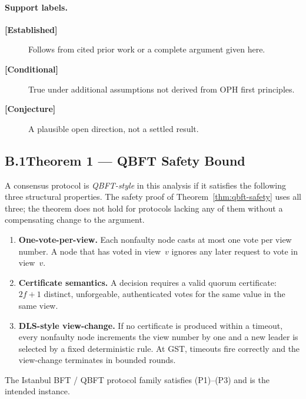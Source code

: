 \paragraph{Support labels.}
\begin{description}
  \item[\textbf{[Established]}] Follows from cited prior work or a complete
        argument given here.
  \item[\textbf{[Conditional]}] True under additional assumptions not
        derived from \textrm{OPH} first principles.
  \item[\textbf{[Conjecture]}] A plausible open direction, not a settled result.
\end{description}

\subsection*{B.1\quad Theorem 1 --- QBFT Safety Bound}

\begin{definition}
\label{def:qbft-style}
A consensus protocol is \emph{QBFT-style} in this analysis if it satisfies
the following three structural properties.
The safety proof of Theorem~\ref{thm:qbft-safety} uses all three;
the theorem does not hold for protocols lacking any of them without a
compensating change to the argument.
\begin{enumerate}[(P1)]
  \item \textbf{One-vote-per-view.}
        Each nonfaulty node casts at most one vote per view number.
        A node that has voted in view~$v$ ignores any later request
        to vote in view~$v$.
  \item \textbf{Certificate semantics.}
        A decision requires a valid quorum certificate: $2f+1$ distinct,
        unforgeable, authenticated votes for the same value in the same view.
  \item \textbf{DLS-style view-change.}
        If no certificate is produced within a timeout, every nonfaulty node
        increments the view number by one and a new leader is selected by a
        fixed deterministic rule.  At \textrm{GST}, timeouts fire correctly
        and the view-change terminates in bounded rounds.
\end{enumerate}
The Istanbul BFT / QBFT protocol family
\cite{Moniz2020,Saltini}
satisfies (P1)--(P3) and is the intended instance.
\end{definition}

